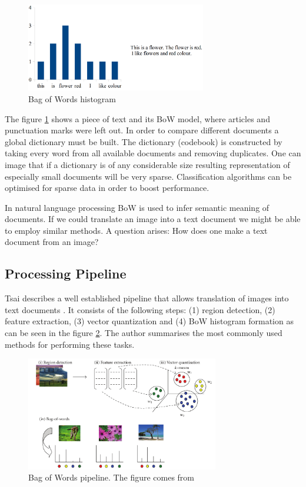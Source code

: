 	\begin{figure}[!ht]
	\centering
	\includegraphics[width=0.7\textwidth]{figs/bow_example}
	\caption{Bag of Words histogram}
	\label{fig:bow_example}
	\end{figure}
	
	The figure \ref{fig:bow_example} shows a piece of text and its BoW model, where articles and punctuation marks were left out. In order to compare different documents a global dictionary must be built. The dictionary (codebook) is constructed by taking every word from all available documents and removing duplicates. One can image that if a dictionary is of any considerable size resulting representation of especially small documents will be very sparse. Classification algorithms can be optimised for sparse data in order to boost performance.

	In natural language processing BoW is used to infer semantic meaning of documents. If we could translate an image into a text document we might be able to employ similar methods. A question arises: How does one make a text document from an image?

	\subsection{Processing Pipeline}	
	Tsai describes a well established pipeline that allows translation of images into text documents \cite{tsai2012bag}. It consists of the following steps: (1) region detection, (2) feature extraction, (3) vector quantization and (4) BoW histogram formation as can be seen in the figure \ref{fig:bow_pipeline}. The author summarises the most commonly used methods for performing these tasks. 
	
	\begin{figure}[!ht]
	\centering
	\includegraphics[width=0.75\textwidth]{figs/tsai2012}
	\caption{Bag of Words pipeline. The figure comes from \cite{tsai2012bag}}
	\label{fig:bow_pipeline}
	\end{figure}
	
